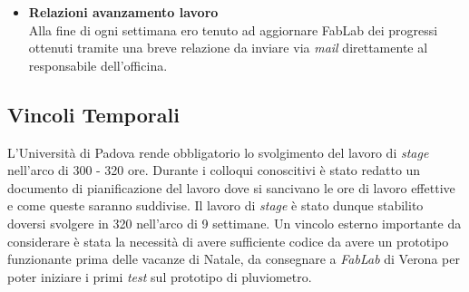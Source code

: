 \begin{itemize}
\item \textbf{Relazioni avanzamento lavoro}\\
	Alla fine di ogni settimana ero tenuto ad aggiornare FabLab dei progressi ottenuti tramite una breve relazione da inviare via \textit{mail} direttamente al responsabile dell'officina.
\end{itemize}


\subsection{Vincoli Temporali}

L'Università di Padova rende obbligatorio lo svolgimento del lavoro di \textit{stage} nell'arco di 300 - 320 ore. Durante i colloqui conoscitivi è stato redatto un documento  di pianificazione del lavoro dove si sancivano le ore di lavoro effettive e come queste saranno suddivise. Il lavoro di \textit{stage} è stato dunque stabilito doversi svolgere in 320 nell'arco di 9 settimane. Un vincolo esterno importante da considerare è stata la necessità di avere sufficiente codice da avere un prototipo funzionante prima delle vacanze di Natale, da consegnare a \textit{FabLab} di Verona per poter iniziare i primi \textit{test} sul prototipo di pluviometro. 


